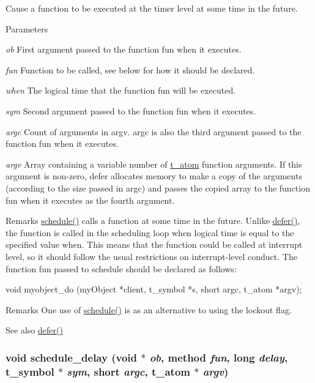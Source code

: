 Cause a function to be executed at the timer level at some time in the future. 
\begin{DoxyParams}{Parameters}
\item[{\em ob}]First argument passed to the function fun when it executes. \item[{\em fun}]Function to be called, see below for how it should be declared. \item[{\em when}]The logical time that the function fun will be executed. \item[{\em sym}]Second argument passed to the function fun when it executes. \item[{\em argc}]Count of arguments in argv. argc is also the third argument passed to the function fun when it executes. \item[{\em argv}]Array containing a variable number of \hyperlink{structt__atom}{t\_\-atom} function arguments. If this argument is non-\/zero, defer allocates memory to make a copy of the arguments (according to the size passed in argc) and passes the copied array to the function fun when it executes as the fourth argument.\end{DoxyParams}
\begin{DoxyRemark}{Remarks}
\hyperlink{group__threading_ga1eb8ec7623f0806dd079d7be708c19a8}{schedule()} calls a function at some time in the future. Unlike \hyperlink{group__threading_gaa24a0c9896f1ad241e45590065c3f643}{defer()}, the function is called in the scheduling loop when logical time is equal to the specified value when. This means that the function could be called at interrupt level, so it should follow the usual restrictions on interrupt-\/level conduct. The function fun passed to schedule should be declared as follows:
\end{DoxyRemark}

\begin{DoxyCode}
    void myobject_do (myObject *client, t_symbol *s, short argc, t_atom *argv); 
\end{DoxyCode}


\begin{DoxyRemark}{Remarks}
One use of \hyperlink{group__threading_ga1eb8ec7623f0806dd079d7be708c19a8}{schedule()} is as an alternative to using the lockout flag.
\end{DoxyRemark}
\begin{DoxySeeAlso}{See also}
\hyperlink{group__threading_gaa24a0c9896f1ad241e45590065c3f643}{defer()} 
\end{DoxySeeAlso}
\hypertarget{group__threading_gaa9b66fe2fc601f110bd962a622f1d5a0}{
\subsubsection[{schedule\_\-delay}]{\setlength{\rightskip}{0pt plus 5cm}void schedule\_\-delay (void $\ast$ {\em ob}, \/  {\bf method} {\em fun}, \/  long {\em delay}, \/  {\bf t\_\-symbol} $\ast$ {\em sym}, \/  short {\em argc}, \/  {\bf t\_\-atom} $\ast$ {\em argv})}}
\label{group__threading_gaa9b66fe2fc601f110bd962a622f1d5a0}


